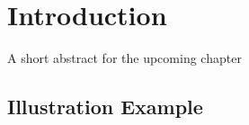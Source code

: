 \chapter{Introduction}
\label{chap:intro}
\begin{shortAbstract}
A short abstract for the upcoming chapter
\end{shortAbstract}


\section{Illustration Example}
